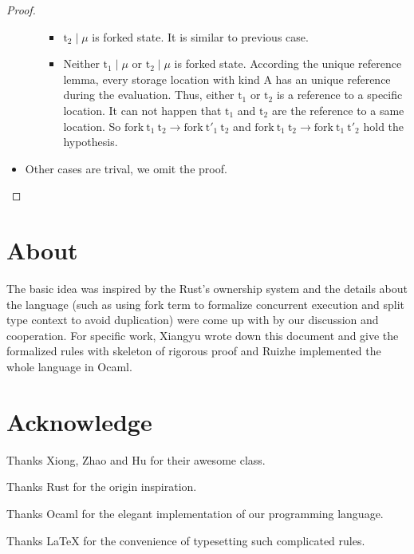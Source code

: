 \documentclass[10pt]{article}
\newcommand{\lto}{\longrightarrow}
\theoremstyle{definition}\newtheorem*{theorem}{Theorem}
\theoremstyle{definition}\newtheorem*{definition}{Definition}
\theoremstyle{definition}\newtheorem*{lemma}{Lemma}
\begin{document}
\begin{proof}
\begin{itemize}
\begin{itemize}
\begin{itemize}
                            \item $\mathrm{t_2}\mid\mu$ is forked state. It is similar to previous case.
                            \item Neither $\mathrm{t_1}\mid\mu$ or $\mathrm{t_2}\mid\mu$ is forked state. According the unique reference lemma, every storage location with kind $\mathrm{A}$ has an unique reference during the evaluation.
                                Thus, either $\mathrm{t_1}$ or $\mathrm{t_2}$ is a reference to a specific location. It can not happen that $\mathrm{t_1}$ and $\mathrm{t_2}$ are the reference to a same location. So $\mathrm{fork}\ \mathrm{t_1}\ \mathrm{t_2}\lto\mathrm{fork}\ \mathrm{t'_1}\ \mathrm{t_2}$
                                and $\mathrm{fork}\ \mathrm{t_1}\ \mathrm{t_2}\lto\mathrm{fork}\ \mathrm{t_1}\ \mathrm{t'_2}$ hold the hypothesis.
                        \end{itemize}
                \end{itemize}
            \item Other cases are trival, we omit the proof.
        \end{itemize}
    \end{proof}
    \section{About}
    The basic idea was inspired by the Rust's ownership system and the details about the language (such as using fork term to formalize concurrent execution and split type context to avoid duplication) were come up with by our discussion and cooperation.
    For specific work, Xiangyu wrote down this document and give the formalized rules with skeleton of rigorous proof and Ruizhe implemented the whole language in Ocaml.
    \section{Acknowledge}
    Thanks Xiong, Zhao and Hu for their awesome class.

    Thanks Rust for the origin inspiration.

    Thanks Ocaml for the elegant implementation of our programming language.

    Thanks \LaTeX{} for the convenience of typesetting such complicated rules.
\end{document}
